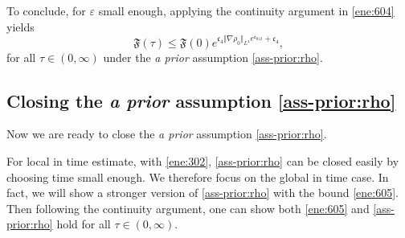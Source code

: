 \documentclass[11pt]{article}
\theoremstyle{plain}
\theoremstyle{definition}
\theoremstyle{remark}
\newcommand{\norm}[2]{\Vert #1 \Vert_{#2}}
\numberwithin{equation}{section}
\begin{document}
To conclude, for $ \varepsilon $ small enough, applying the continuity argument in \eqref{ene:604} yields 
\begin{equation}
    \label{ene:605}
    \mathfrak F(\tau) \leq \mathfrak F(0) e^{\mathfrak c_4 \norm{\nabla \rho_0}{L^4} e^{\mathfrak c_{012}} + \mathfrak c_4},
\end{equation}
for all $ \tau \in (0,\infty) $ under the {\it a prior} assumption \eqref{ass-prior:rho}. 

\subsection{Closing the \textbf{\it a prior} assumption \eqref{ass-prior:rho}} \label{sec:closing}

Now we are ready to close the {\it a prior} assumption \eqref{ass-prior:rho}. 

For local in time estimate, with \eqref{ene:302}, \eqref{ass-prior:rho} can be closed easily by choosing time small enough. We therefore focus on the global in time case. In fact, we will show a stronger version of \eqref{ass-prior:rho} with the bound \eqref{ene:605}. Then following the continuity argument, one can show both \eqref{ene:605} and \eqref{ass-prior:rho} hold for all $ \tau \in (0,\infty) $. 

\smallskip 
\end{document}
